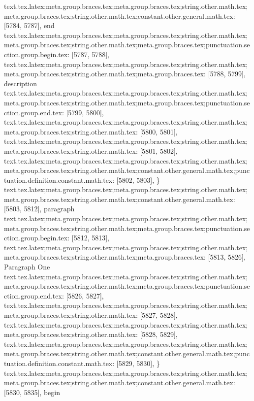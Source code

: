{{{{{{{{{{{{{{{{{{{{{{{{{{{{{{{{{{{{{{{{{{{{{{{{{{{{{{{{{{{{{{{{{{{{{{{{{{{{{{{{{{{{{{{{{{{{{{{{{{{{{{{{{{{{{{{{{{{{{{{{{{{{{{{{{{{{{{{{{{{{{{{{{{{{{{{{{{{{{{{{text.tex.latex;meta.group.braces.tex;meta.group.braces.tex;string.other.math.tex;meta.group.braces.tex;string.other.math.tex;constant.other.general.math.tex: [5784, 5787], {end}
text.tex.latex;meta.group.braces.tex;meta.group.braces.tex;string.other.math.tex;meta.group.braces.tex;string.other.math.tex;meta.group.braces.tex;punctuation.section.group.begin.tex: [5787, 5788], {{}
text.tex.latex;meta.group.braces.tex;meta.group.braces.tex;string.other.math.tex;meta.group.braces.tex;string.other.math.tex;meta.group.braces.tex: [5788, 5799], {description}
text.tex.latex;meta.group.braces.tex;meta.group.braces.tex;string.other.math.tex;meta.group.braces.tex;string.other.math.tex;meta.group.braces.tex;punctuation.section.group.end.tex: [5799, 5800], {}}
text.tex.latex;meta.group.braces.tex;meta.group.braces.tex;string.other.math.tex;meta.group.braces.tex;string.other.math.tex: [5800, 5801], {
}
text.tex.latex;meta.group.braces.tex;meta.group.braces.tex;string.other.math.tex;meta.group.braces.tex;string.other.math.tex: [5801, 5802], {
}
text.tex.latex;meta.group.braces.tex;meta.group.braces.tex;string.other.math.tex;meta.group.braces.tex;string.other.math.tex;constant.other.general.math.tex;punctuation.definition.constant.math.tex: [5802, 5803], {\}
text.tex.latex;meta.group.braces.tex;meta.group.braces.tex;string.other.math.tex;meta.group.braces.tex;string.other.math.tex;constant.other.general.math.tex: [5803, 5812], {paragraph}
text.tex.latex;meta.group.braces.tex;meta.group.braces.tex;string.other.math.tex;meta.group.braces.tex;string.other.math.tex;meta.group.braces.tex;punctuation.section.group.begin.tex: [5812, 5813], {{}
text.tex.latex;meta.group.braces.tex;meta.group.braces.tex;string.other.math.tex;meta.group.braces.tex;string.other.math.tex;meta.group.braces.tex: [5813, 5826], {Paragraph One}
text.tex.latex;meta.group.braces.tex;meta.group.braces.tex;string.other.math.tex;meta.group.braces.tex;string.other.math.tex;meta.group.braces.tex;punctuation.section.group.end.tex: [5826, 5827], {}}
text.tex.latex;meta.group.braces.tex;meta.group.braces.tex;string.other.math.tex;meta.group.braces.tex;string.other.math.tex: [5827, 5828], {
}
text.tex.latex;meta.group.braces.tex;meta.group.braces.tex;string.other.math.tex;meta.group.braces.tex;string.other.math.tex: [5828, 5829], {
}
text.tex.latex;meta.group.braces.tex;meta.group.braces.tex;string.other.math.tex;meta.group.braces.tex;string.other.math.tex;constant.other.general.math.tex;punctuation.definition.constant.math.tex: [5829, 5830], {\}
text.tex.latex;meta.group.braces.tex;meta.group.braces.tex;string.other.math.tex;meta.group.braces.tex;string.other.math.tex;constant.other.general.math.tex: [5830, 5835], {begin}
}}}}}}}}}}}}}}}}}}}}}}}}}}}}}}}}}}}}}}}}}}}}}}}}}}}}}}}}}}}}}}}}}}}}}}}}}}}}}}}}}}}}}}}}}}}}}}}}}}}}}}}}}}}}}}}}}}}}}}}}}}}}}}}}}}}}}}}}}}}}}}}}}}}}}}}}}}}}}}}}}}
